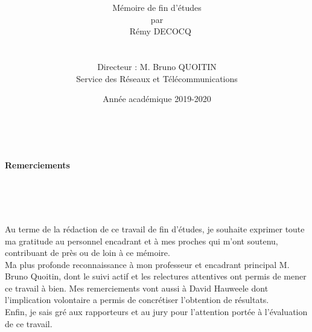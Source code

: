 \documentclass[]{report}
\begin{document}
\title{
\vspace{2cm}
\noindent{}
}



\author{
\LARGE{Mémoire de fin d'études}\\
\LARGE{par}\\
~\vspace{0.4cm}
\LARGE{Rémy DECOCQ}\\
~\\
~\\
\Large
Directeur : M. Bruno QUOITIN\\
Service des Réseaux et Télécommunications
\normalsize
}

\date{
\vspace{10cm}
\Large
Année académique 2019-2020}

\maketitle          

\thispagestyle{empty}   

\newpage
~
\newpage

\begin{center}
\textbf{\LARGE Remerciements}\\
\end{center}
~\\
~\\
~\\
\Large
\par Au terme de la rédaction de ce travail de fin d'études, je souhaite exprimer toute ma gratitude au personnel encadrant et à mes proches qui m'ont soutenu, contribuant de près ou de loin à ce mémoire.\\

Ma plus profonde reconnaissance à mon professeur et encadrant principal M. Bruno Quoitin, dont le suivi actif et les relectures attentives ont permis de mener ce travail à bien. Mes remerciements vont aussi à David Hauweele dont l'implication volontaire a permis de concrétiser l'obtention de résultats.\\

Enfin, je sais gré aux rapporteurs et au jury pour l'attention portée à l'évaluation de ce travail.
\normalsize
\end{document}
